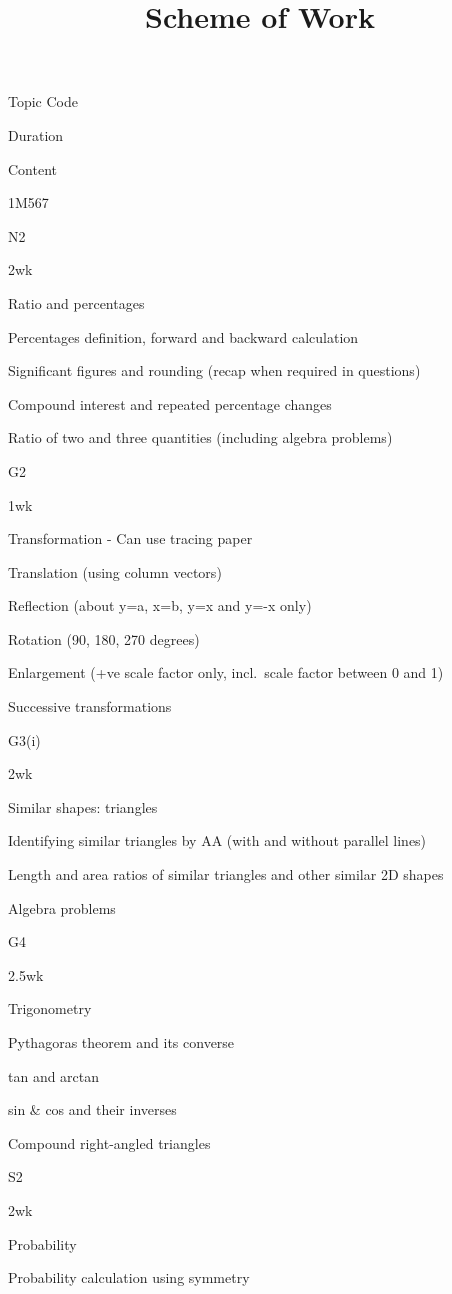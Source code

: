 \documentclass[
]{article}
\title{Scheme of Work}
\author{}
\date{}
\begin{document}
\maketitle


Topic Code

Duration

Content

1M567

N2

2wk

Ratio and percentages

Percentages definition, forward and backward calculation

Significant figures and rounding (recap when required in questions)

Compound interest and repeated percentage changes

Ratio of two and three quantities (including algebra problems)

G2

1wk

Transformation - Can use tracing paper

Translation (using column vectors)

Reflection (about y=a, x=b, y=x and y=-x only)

Rotation (90, 180, 270 degrees)

Enlargement (+ve scale factor only, incl.~scale factor between 0 and 1)

Successive transformations

G3(i)

2wk

Similar shapes: triangles

Identifying similar triangles by AA (with and without parallel lines)

Length and area ratios of similar triangles and other similar 2D shapes

Algebra problems

G4

2.5wk

Trigonometry

Pythagoras theorem and its converse

tan and arctan

sin \& cos and their inverses

Compound right-angled triangles

S2

2wk

Probability

Probability calculation using symmetry
\end{document}
